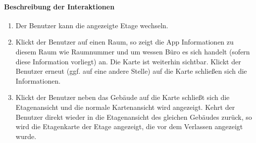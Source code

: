 \paragraph{Beschreibung der Interaktionen}
\begin{enumerate}[start=21, label=\textbf{/FA\arabic*/}, align=left]
    \item Der Benutzer kann die angezeigte Etage wechseln.
    \item Klickt der Benutzer auf einen Raum, so zeigt die App Informationen zu diesem Raum wie Raumnummer und um wessen Büro es sich handelt (sofern diese Information vorliegt) an. Die Karte ist weiterhin sichtbar. Klickt der Benutzer erneut (ggf. auf eine andere Stelle) auf die Karte schließen sich die Informationen.
    \item Klickt der Benutzer neben das Gebäude auf die Karte schließt sich die Etagenansicht und die normale Kartenansicht wird angezeigt. Kehrt der Benutzer direkt wieder in die Etagenansicht des gleichen Gebäudes zurück, so wird die Etagenkarte der Etage angezeigt, die vor dem Verlassen angezeigt wurde.
\end{enumerate}